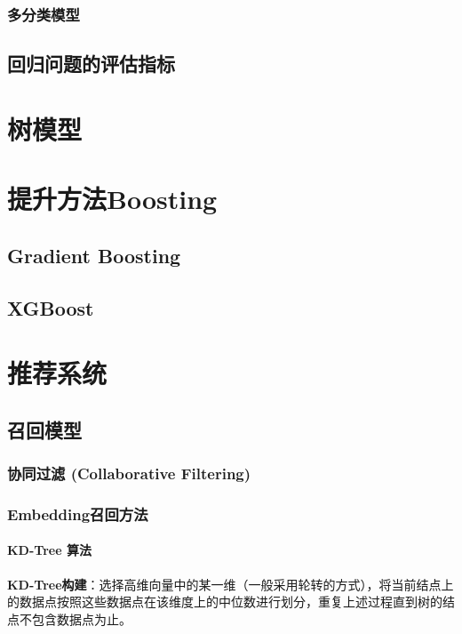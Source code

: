 \documentclass[lang=cn,newtx,10pt,scheme=chinese,color=black]{elegantbook}
\begin{document}
\subsection{多分类模型}


\section{回归问题的评估指标}



\chapter{树模型}

\chapter{提升方法Boosting}

\section{Gradient Boosting}

\section{XGBoost}

\chapter{推荐系统}

\section{召回模型}

\subsection{协同过滤 (Collaborative Filtering)}

\subsection{Embedding召回方法}

\subsubsection{KD-Tree 算法}

\textcolor{importcolor}{\bfseries KD-Tree构建}：选择高维向量中的某一维（一般采用轮转的方式），将当前结点上的数据点按照这些数据点在该维度上的中位数进行划分，重复上述过程直到树的结点不包含数据点为止。
\end{document}

